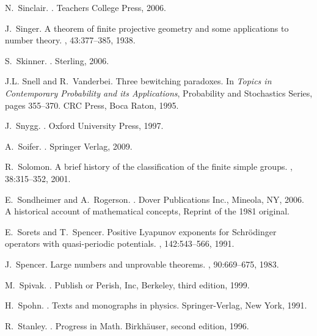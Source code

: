 \documentclass[12pt]{amsart}
\begin{document}
\begin{thebibliography}{100}
N.~Sinclair.
.
\newblock Teachers College Press, 2006.

J.~Singer.
\newblock A theorem of finite projective geometry and some applications to
  number theory.
, 43:377--385, 1938.

S.~Skinner.
.
\newblock Sterling, 2006.

J.L. Snell and R.~Vanderbei.
\newblock Three bewitching paradoxes.
\newblock In {\em Topics in Contemporary Probability and its Applications},
  Probability and Stochastics Series, pages 355--370. CRC Press, Boca Raton,
  1995.

J.~Snygg.
.
\newblock Oxford University Press, 1997.

A.~Soifer.
.
\newblock Springer Verlag, 2009.

R.~Solomon.
\newblock A brief history of the classification of the finite simple groups.
, 38:315--352, 2001.

E.~Sondheimer and A.~Rogerson.
.
\newblock Dover Publications Inc., Mineola, NY, 2006.
\newblock A historical account of mathematical concepts, Reprint of the 1981
  original.

E.~Sorets and T.~Spencer.
\newblock Positive {Lyapunov} exponents for {Schr\"odinger} operators with
  quasi-periodic potentials.
, 142:543--566, 1991.

J.~Spencer.
\newblock Large numbers and unprovable theorems.
, 90:669--675, 1983.

M.~Spivak.
.
\newblock Publish or Perish, Inc, Berkeley, third edition, 1999.

H.~Spohn.
.
\newblock Texts and monographs in physics. Springer-Verlag, New York, 1991.

R.~Stanley.
.
\newblock Progress in Math. Birk{h\"a}user, second edition, 1996.


\end{thebibliography}
\end{document}
